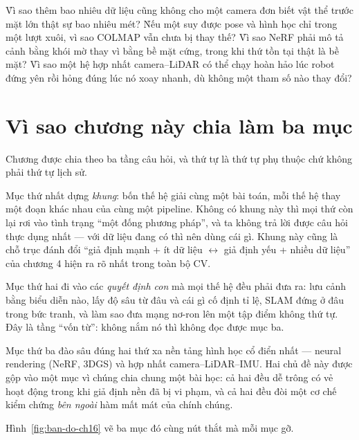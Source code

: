 \documentclass[../../deep_learning.tex]{subfiles}
\begin{document}
\begin{khoigoi}
\h{Vì sao thêm bao nhiêu dữ liệu cũng không cho một camera đơn biết vật thể trước mặt lớn thật sự bao nhiêu mét?}
\h{Nếu một  suy được pose và hình học chỉ trong một lượt xuôi, vì sao COLMAP vẫn chưa bị thay thế?}
\h{Vì sao NeRF phải mô tả cảnh bằng khói mờ thay vì bằng bề mặt cứng, trong khi thứ tồn tại thật là bề mặt?}
\h{Vì sao một hệ hợp nhất camera--LiDAR có thể chạy hoàn hảo lúc robot đứng yên rồi hỏng đúng lúc nó xoay nhanh, dù không một tham số nào thay đổi?}
\end{khoigoi}

\section*{Vì sao chương này chia làm ba mục}
Chương được chia theo ba tầng câu hỏi, và thứ tự là thứ tự phụ thuộc chứ không phải thứ tự lịch sử.

Mục thứ nhất dựng \emph{khung}: bốn thế hệ giải cùng một bài toán, mỗi thế hệ thay một đoạn khác nhau của cùng một pipeline. Không có khung này thì mọi thứ còn lại rơi vào tình trạng ``một đống phương pháp'', và ta không trả lời được câu hỏi thực dụng nhất --- với dữ liệu đang có thì nên dùng cái gì. Khung này cũng là chỗ trục đánh đổi ``giả định mạnh + ít dữ liệu \(\leftrightarrow\) giả định yếu + nhiều dữ liệu'' của chương 4 hiện ra rõ nhất trong toàn bộ CV.

Mục thứ hai đi vào các \emph{quyết định con} mà mọi thế hệ đều phải đưa ra: lưu cảnh bằng biểu diễn nào, lấy độ sâu từ đâu và cái gì cố định tỉ lệ, SLAM đứng ở đâu trong bức tranh, và làm sao đưa mạng nơ-ron lên một tập điểm không thứ tự. Đây là tầng ``vốn từ'': không nắm nó thì không đọc được mục ba.

Mục thứ ba đào sâu đúng hai thứ xa nền tảng hình học cổ điển nhất --- neural rendering (NeRF, 3DGS) và hợp nhất camera--LiDAR--IMU. Hai chủ đề này được gộp vào một mục vì chúng chia chung một bài học: cả hai đều dễ trông có vẻ hoạt động trong khi giả định nền đã bị vi phạm, và cả hai đều đòi một cơ chế kiểm chứng \emph{bên ngoài} hàm mất mát của chính chúng.

Hình~\ref{fig:ban-do-ch16} vẽ ba mục đó cùng nút thắt mà mỗi mục gỡ.
\end{document}
